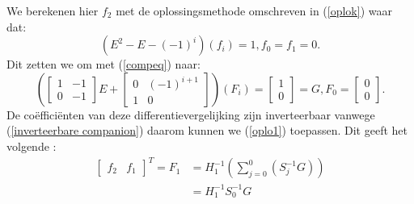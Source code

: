 \documentclass[a4paper,12pt]{article}
\begin{document}
\begin{example}
    We berekenen hier $f_{2}$ met de oplossingsmethode omschreven in (\ref{oplok}) waar dat:
    $$
        (E^2-E-(-1)^i)(f_i)=1, f_0 = f_1 = 0.
    $$
    Dit zetten we om met (\ref{compeq}) naar:
    $$
        \left(
        \left[
            \begin{array}{cc}
                1 & -1 \\
                0 & -1
            \end{array}
            \right] E +
        \left[
            \begin{array}{cc}
                0 & (-1)^{i+1} \\
                1 & 0
            \end{array}
            \right] \right) (F_i) =
        \left[\begin{array}{c}
                1 \\
                0
            \end{array}\right] = G , F_0 =\left[\begin{array}{c}
                0 \\
                0
            \end{array}\right].
    $$
    De coëfficiënten van deze differentievergelijking zijn inverteerbaar vanwege (\ref{inverteerbare companion})
    daarom kunnen we (\ref{oplo1}) toepassen. Dit geeft het volgende :
    \begin{align*}
        \left[\begin{array}{cc}
                      f_{2} & f_{1}
                  \end{array} \right]^T
        =F_{1} & = H_{1}^{-1}\left( \sum_{j=0}^{0}{\left( S_j^{-1} G \right)}  \right) \\
               & =  H_{1}^{-1} S_0^{-1} G
    \end{align*}


\end{example}
\end{document}
